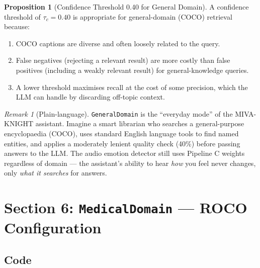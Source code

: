 \documentclass[12pt,a4paper]{article}
\theoremstyle{definition}
\newtheorem{proposition}[theorem]{Proposition}
\theoremstyle{remark}
\newtheorem{remark}[theorem]{Remark}
\begin{document}
\begin{proposition}[Confidence Threshold 0.40 for General Domain]
A confidence threshold of $\tau_c = 0.40$ is appropriate for
general-domain (COCO) retrieval because:
\begin{enumerate}
  \item COCO captions are diverse and often loosely related to the query.
  \item False negatives (rejecting a relevant result) are more costly
        than false positives (including a weakly relevant result) for
        general-knowledge queries.
  \item A lower threshold maximises recall at the cost of some precision,
        which the LLM can handle by discarding off-topic context.
\end{enumerate}
\end{proposition}

\begin{remark}[Plain-language]
\texttt{GeneralDomain} is the ``everyday mode'' of the MIVA-KNIGHT assistant.
Imagine a smart librarian who searches a general-purpose encyclopaedia (COCO),
uses standard English language tools to find named entities, and applies a
moderately lenient quality check (40\%) before passing answers to the LLM.
The audio emotion detector still uses Pipeline C weights regardless of domain —
the assistant's ability to hear \emph{how} you feel never changes, only
\emph{what it searches} for answers.
\end{remark}

\section{Section 6: \texttt{MedicalDomain} — ROCO Configuration}

\subsection{Code}
\end{document}
